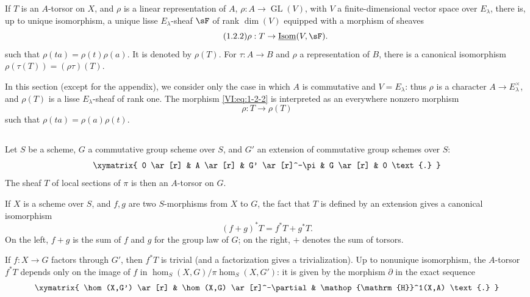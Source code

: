 \documentclass[12pt,oneside,english]{smfbook}
\DeclareMathOperator{\gl}{GL}
\DeclareMathOperator{\h}{H}
\newcounter{char}
\begin{document}
If $T$ is an $A$-torsor on $X$, and $\rho$ is a linear representation of $A$, $\rho:A\to\gl(V)$, with $V$ a finite-dimensional vector space over $E_\lambda$, there is, up to unique isomorphism, a unique lisse $E_\lambda$-sheaf $\sF$ of rank $\dim(V)$ equipped with a morphism of sheaves
\begin{equation*}\tag{1.2.2}\label{VI:eq:1-2-2}
  \rho:T\to \underline{\operatorname{Isom}}(V,\sF) \text{.}
\end{equation*}
such that $\rho(ta)=\rho(t)\rho(a)$. It is denoted by $\rho(T)$. For $\tau:A\to B$ and $\rho$ a representation of $B$, there is a canonical isomorphism $\rho(\tau(T))=(\rho\tau)(T)$.

In this section (except for the appendix), we consider only the case in which $A$ is commutative and $V=E_\lambda$: thus $\rho$ is a character $A\to E_\lambda^\times$, and $\rho(T)$ is a lisse $E_\lambda$-sheaf of rank one. The morphism \eqref{VI:eq:1-2-2} is interpreted as an everywhere nonzero morphism
\begin{equation*}\tag{1.2.3}\label{VI:eq:1-2-3}
  \rho:T\to \rho(T)
\end{equation*}
such that $\rho(ta)=\rho(a)\rho(t)$.

\subsection{}\label{VI:1-3}

Let $S$ be a scheme, $G$ a commutative group scheme over $S$, and $G'$ an extension of commutative group schemes over $S$:
\[\xymatrix{
  0 \ar[r]
    & A \ar[r]
    & G' \ar[r]^-\pi
    & G \ar[r]
    & 0 \text{.}
}\]
The sheaf $T$ of local sections of $\pi$ is then an $A$-torsor on $G$.

If $X$ is a scheme over $S$, and $f,g$ are two $S$-morphisms from $X$ to $G$, the fact that $T$ is defined by an extension gives a canonical isomorphism
\begin{equation*}\tag{1.3.1}\label{VI:eq:1-3-1}
  (f+g)^\ast T = f^\ast T + g^\ast T \text{.}
\end{equation*}
On the left, $f+g$ is the sum of $f$ and $g$ for the group law of $G$; on the right, $+$ denotes the sum of torsors.

If $f:X\to G$ factors through $G'$, then $f^\ast T$ is trivial (and a factorization gives a trivialization). Up to nonunique isomorphism, the $A$-torsor $f^\ast T$ depends only on the image of $f$ in $\hom_S(X,G)/\pi\hom_S(X,G')$: it is given by the morphism $\partial$ in the exact sequence
\[\xymatrix{
  \hom(X,G') \ar[r]
    & \hom(X,G) \ar[r]^-\partial
    & \h^1(X,A) \text{.}
}\]
\end{document}
